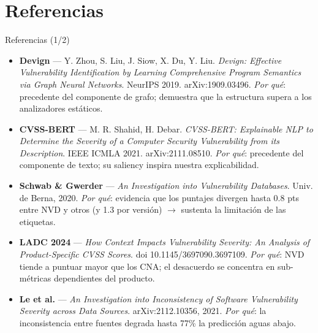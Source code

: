 \documentclass[aspectratio=169,10pt]{beamer}
\begin{document}
\section{Referencias}
\begin{frame}{Referencias (1/2)}
\tiny
\begin{itemize}
\item \textbf{Devign} — Y. Zhou, S. Liu, J. Siow, X. Du, Y. Liu. \textit{Devign: Effective Vulnerability Identification by Learning Comprehensive Program Semantics via Graph Neural Networks}. NeurIPS 2019. arXiv:1909.03496. \newline
\textit{Por qué}: precedente del componente de grafo; demuestra que la estructura supera a los analizadores estáticos.
\item \textbf{CVSS-BERT} — M. R. Shahid, H. Debar. \textit{CVSS-BERT: Explainable NLP to Determine the Severity of a Computer Security Vulnerability from its Description}. IEEE ICMLA 2021. arXiv:2111.08510. \newline
\textit{Por qué}: precedente del componente de texto; su saliency inspira nuestra explicabilidad.
\item \textbf{Schwab \& Gwerder} — \textit{An Investigation into Vulnerability Databases}. Univ. de Berna, 2020. \newline
\textit{Por qué}: evidencia que los puntajes divergen hasta 0.8 pts entre NVD y otros (y 1.3 por versión) $\to$ sustenta la limitación de las etiquetas.
\item \textbf{LADC 2024} — \textit{How Context Impacts Vulnerability Severity: An Analysis of Product-Specific CVSS Scores}. doi 10.1145/3697090.3697109. \newline
\textit{Por qué}: NVD tiende a puntuar mayor que los CNA; el desacuerdo se concentra en sub-métricas dependientes del producto.
\item \textbf{Le et al.} — \textit{An Investigation into Inconsistency of Software Vulnerability Severity across Data Sources}. arXiv:2112.10356, 2021. \newline
\textit{Por qué}: la inconsistencia entre fuentes degrada hasta 77\% la predicción aguas abajo.
\end{itemize}
\end{frame}
\end{document}
